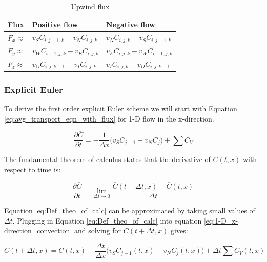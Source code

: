 \vspace{12.7mm} %

\begin{table}[htbp!]
   \caption{\label{tab:upwind_flux_eqns} Upwind flux}
   \centering
   \begin{tabular}{l l l}
   \hline
   \textbf{Flux} & \textbf{Positive flow} & \textbf{Negative flow} \\
   \hline 
    $F_{x} \approx$ & $v_{S} C_{i,j-1,k} - v_{N}C_{i,j,k}$ & $v_{N}C_{i,j,k} - v_{S} C_{i,j-1,k}$ \\ [1ex]
    $F_{y} \approx$ & $v_{W} C_{i-1,j,k} - v_{E}C_{i,j,k}$ & $v_{E}C_{i,j,k} - v_{W} C_{i-1,j,k}$ \\ [1ex]
    $F_{z} \approx$ & $v_{O} C_{i,j,k-1} - v_{I}C_{i,j,k}$ & $v_{I}C_{i,j,k} - v_{O} C_{i,j,k-1}$ \\ [1ex]
   \hline
   \end{tabular}
\end{table}

\subsubsection{Explicit Euler}
To derive the first order explicit Euler scheme we will start with Equation \ref{eq:avg_transport_eqn_with_flux} for 1-D flow in the x-direction.

\begin{equation}
        \frac{\partial \overline{C}}{\partial t} = - \frac{1}{\Delta x} \big(v_{S} \overline{C}_{j-1} - v_{N}\overline{C}_{j}\big)  + \sum \overline{C}_{V}
        \label{eq:1-D_x-direction_convection}
\end{equation}

The fundamental theorem of calculus states that the derivative of $\overline{C}(t,x)$ with respect to time is:

\begin{equation}
    \frac{\partial \overline{C}}{\partial t} = \lim_{\Delta t\to 0} \frac{\overline{C}(t+\Delta t, x) - \overline{C}(t,x)}{\Delta t}
    \label{eq:Def_theo_of_calc}
\end{equation}

Equation \ref{eq:Def_theo_of_calc} can be approximated by taking small values of $\Delta t$. Plugging in Equation \ref{eq:Def_theo_of_calc} into equation \ref{eq:1-D_x-direction_convection} and solving for $\overline{C}(t+\Delta t, x)$ gives:

\begin{equation}
    \overline{C}(t+\Delta t, x) = \overline{C}(t,x) - \frac{\Delta t}{\Delta x} \big(v_{S} \overline{C}_{j-1}(t,x) - v_{N}\overline{C}_{j}(t,x)\big)  + \Delta t\sum \overline{C}_{V}(t,x)
    \label{eq:explicit_method}
\end{equation}

